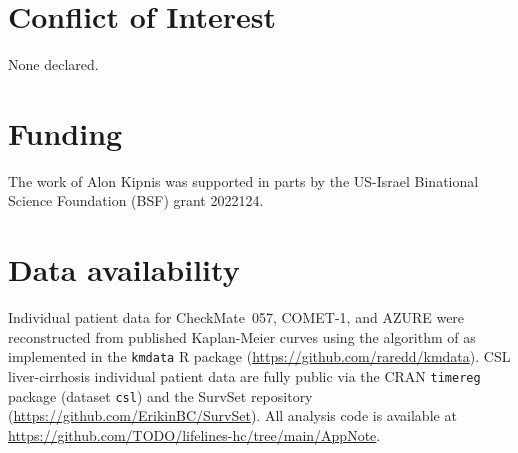 \documentclass[unnumsec,webpdf,contemporary,large]{oup-authoring-template}
\begin{document}


\section*{Conflict of Interest}
None declared.

\section*{Funding}
The work of Alon Kipnis was supported in parts by the US-Israel Binational Science Foundation (BSF) grant 2022124.

\section*{Data availability}
Individual patient data for CheckMate~057, COMET-1, and AZURE were
reconstructed from published Kaplan-Meier curves using the algorithm of
\citet{guyot2012} as implemented in the \texttt{kmdata} R package
(\url{https://github.com/raredd/kmdata}). CSL liver-cirrhosis individual
patient data are fully public via the CRAN \texttt{timereg} package
(dataset \texttt{csl}) and the SurvSet repository \citep{survset2022}
(\url{https://github.com/ErikinBC/SurvSet}).
All analysis code is available at
\url{https://github.com/TODO/lifelines-hc/tree/main/AppNote}.


\end{document}
